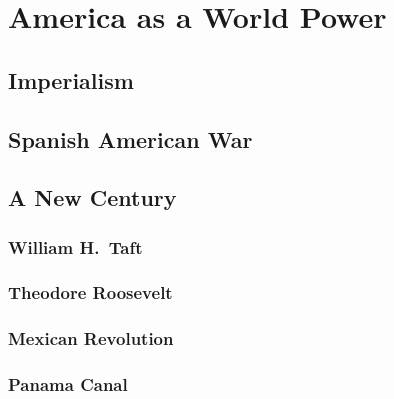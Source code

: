 \chapter{America as a World Power}

\section{Imperialism}

\section{Spanish American War}

\section{A New Century}

\subsection*{William H.\ Taft}

\subsection*{Theodore Roosevelt}

\subsection*{Mexican Revolution}

\subsection*{Panama Canal}
